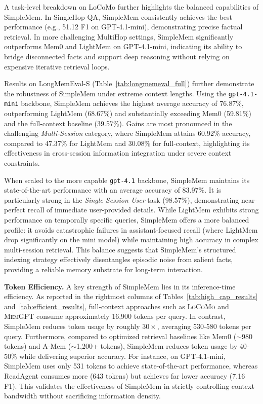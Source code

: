 \documentclass{article}
\newcommand{\ours}{SimpleMem}
\theoremstyle{plain}
\theoremstyle{definition}
\theoremstyle{remark}
\begin{document}
A task-level breakdown on LoCoMo further highlights the balanced capabilities of \ours{}. In SingleHop QA, \ours{} consistently achieves the best performance (e.g., 51.12 F1 on GPT-4.1-mini), demonstrating precise factual retrieval. In more challenging MultiHop settings, \ours{} significantly outperforms Mem0 and LightMem on GPT-4.1-mini, indicating its ability to bridge disconnected facts and support deep reasoning without relying on expensive iterative retrieval loops.

Results on LongMemEval-S (Table~\ref{tab:longmemeval_full}) further demonstrate the robustness of \ours{} under extreme context lengths. Using the \texttt{gpt-4.1-mini} backbone, \ours{} achieves the highest average accuracy of 76.87\%, outperforming LightMem (68.67\%) and substantially exceeding Mem0 (59.81\%) and the full-context baseline (39.57\%). Gains are most pronounced in the challenging \textit{Multi-Session} category, where \ours{} attains 60.92\% accuracy, compared to 47.37\% for LightMem and 30.08\% for full-context, highlighting its effectiveness in cross-session information integration under severe context constraints.

When scaled to the more capable \texttt{gpt-4.1} backbone, \ours{} maintains its state-of-the-art performance with an average accuracy of 83.97\%. It is particularly strong in the \textit{Single-Session User} task (98.57\%), demonstrating near-perfect recall of immediate user-provided details. While LightMem exhibits strong performance on temporally specific queries, \ours{} offers a more balanced profile: it avoids catastrophic failures in assistant-focused recall (where LightMem drop significantly on the mini model) while maintaining high accuracy in complex multi-session retrieval. This balance suggests that \ours{}’s structured indexing strategy effectively disentangles episodic noise from salient facts, providing a reliable memory substrate for long-term interaction.



\noindent \textbf{Token Efficiency.}
A key strength of \ours{} lies in its inference-time efficiency. As reported in the rightmost columns of Tables~\ref{tab:high_cap_results} and~\ref{tab:efficient_results}, full-context approaches such as \textsc{LoCoMo} and \textsc{MemGPT} consume approximately 16,900 tokens per query.
In contrast, \ours{} reduces token usage by roughly $30\times$, averaging 530-580 tokens per query.
Furthermore, compared to optimized retrieval baselines like Mem0 ($\sim$980 tokens) and A-Mem ($\sim$1,200+ tokens), \ours{} reduces token usage by 40-50\% while delivering superior accuracy. 
For instance, on GPT-4.1-mini, \ours{} uses only 531 tokens to achieve state-of-the-art performance, whereas ReadAgent consumes more (643 tokens) but achieves far lower accuracy (7.16 F1). This validates the effectiveness of \ours{} in strictly controlling context bandwidth without sacrificing information density.
\end{document}
